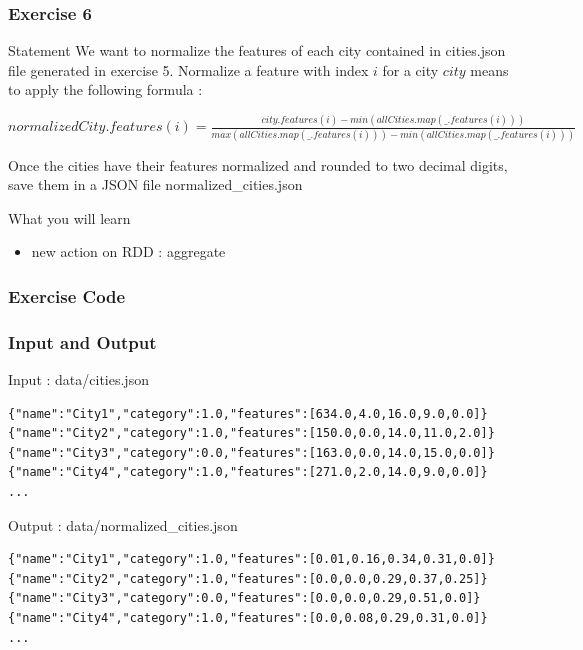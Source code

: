 \documentclass[slidetop,9pt,utf8]{beamer}
\begin{document}
\begin{frame}
  \frametitle{Exercise 6}

  \begin{block}{Statement}
    We want to normalize the features of each city contained in cities.json file generated in exercise 5. Normalize a feature with index $i$ for a city $city$ means to apply the following formula :
\begin{center} 
    $normalizedCity.features(i) = \frac{city.features(i) - min(allCities.map(\_.features(i)))}{max(allCities.map(\_.features(i))) - min(allCities.map(\_.features(i)))}$
\end{center}
Once the cities have their features normalized and rounded to two decimal digits, save them in a JSON file normalized\_cities.json
  \end{block}

  \begin{block}{What you will learn}
    \begin{itemize}
      \item new action on RDD : aggregate
    \end{itemize}
  \end{block}

\end{frame}

\begin{frame}
  \frametitle{Exercise Code}

  

\end{frame}

\begin{frame}[fragile]

  \frametitle{Input and Output}
  
  \begin{block}{Input : data/cities.json}
    \begin{verbatim}
{"name":"City1","category":1.0,"features":[634.0,4.0,16.0,9.0,0.0]}
{"name":"City2","category":1.0,"features":[150.0,0.0,14.0,11.0,2.0]}
{"name":"City3","category":0.0,"features":[163.0,0.0,14.0,15.0,0.0]}
{"name":"City4","category":1.0,"features":[271.0,2.0,14.0,9.0,0.0]}
...
    \end{verbatim}
  \end{block}

  \begin{block}{Output : data/normalized\_cities.json}
    \begin{verbatim}
{"name":"City1","category":1.0,"features":[0.01,0.16,0.34,0.31,0.0]}
{"name":"City2","category":1.0,"features":[0.0,0.0,0.29,0.37,0.25]}
{"name":"City3","category":0.0,"features":[0.0,0.0,0.29,0.51,0.0]}
{"name":"City4","category":1.0,"features":[0.0,0.08,0.29,0.31,0.0]}
...
    \end{verbatim}
  \end{block}

\end{frame}
\end{document}
